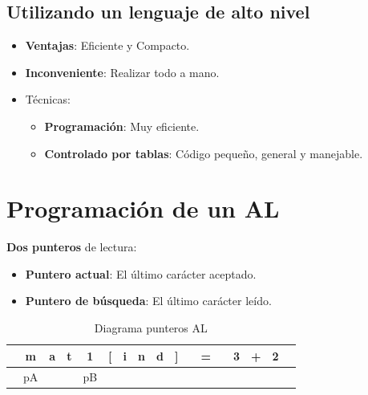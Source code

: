 \documentclass[12pt, twoside, openright]{report} %
\begin{document}
\subsection{Utilizando un lenguaje de alto nivel}

\begin{itemize}
\item
  \textbf{Ventajas}: Eficiente y Compacto.
\item
  \textbf{Inconveniente}: Realizar todo a mano.
\item
  Técnicas:

  \begin{itemize}
  \item \textbf{Programación}: Muy eficiente.    
  \item \textbf{Controlado por tablas}: Código pequeño, general y
    manejable.
  \end{itemize}
\end{itemize}


\section{Programación de un AL}

\textbf{Dos punteros} de lectura:

\begin{itemize}
\item
  \textbf{Puntero actual}: El último carácter aceptado.
\item
  \textbf{Puntero de búsqueda}: El último carácter leído.
\end{itemize}

\begin{table}[H]
\centering
\begin{tabular}{ccccccccccccccccc}
\hline
\multicolumn{1}{|c|}{} & \multicolumn{1}{c|}{m} & \multicolumn{1}{c|}{a} & \multicolumn{1}{c|}{t} & \multicolumn{1}{c|}{1} & \multicolumn{1}{c|}{{[}} & \multicolumn{1}{c|}{i} & \multicolumn{1}{c|}{n} & \multicolumn{1}{c|}{d} & \multicolumn{1}{c|}{{]}} & \multicolumn{1}{c|}{} & \multicolumn{1}{c|}{=} & \multicolumn{1}{c|}{} & \multicolumn{1}{c|}{3} & \multicolumn{1}{c|}{+} & \multicolumn{1}{c|}{2} & \multicolumn{1}{c|}{} \\ \hline
                       & pA                     &                        &                        & pB                     &                          &                        &                        &                        &                          &                       &                        &                       &                        &                        &                        &                      
\end{tabular}
\caption{Diagrama punteros AL}
\end{table}
\end{document}
